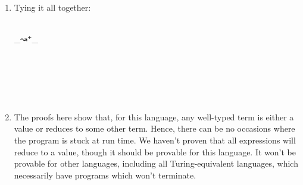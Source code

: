 \documentclass{article}
\begin{document}
\begin{enumerate}
\begin{enumerate}[label=\roman*]
  \item
    Tying it all together:

    \begin{code}%
\>\<%
\\
\>  \_↝⁺\_\<%
\\
\> \AgdaSymbol{:}     \<%
\\
\> \AgdaSymbol{=}  \<%
\\
%
\\
\> \AgdaSymbol{:}   \AgdaSymbol{\}}                     \AgdaSymbol{)}\<%
\\
\>  \AgdaInductiveConstructor{[}  \AgdaInductiveConstructor{]} \AgdaSymbol{=}  \AgdaSymbol{(}  \AgdaSymbol{)}\<%
\\
\>  \AgdaSymbol{(}  \AgdaSymbol{)} \AgdaSymbol{=}  \AgdaSymbol{(}  \AgdaSymbol{)} \<%
\end{code}

  \item
    The proofs here show that, for this language, any well-typed term is either a value or reduces to some other term. Hence, there can be no occasions where the program is stuck at run time. We haven't proven that all expressions will reduce to a value, though it should be provable for this language. It won't be provable for other languages, including all Turing-equivalent languages, which necessarily have programs which won't terminate.
  \end{enumerate}


\end{enumerate}
\end{document}

